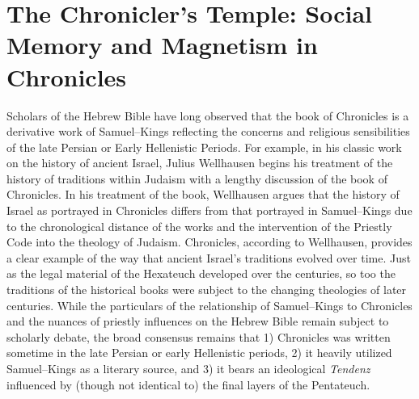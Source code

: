 
\hypertarget{the-chroniclers-temple-social-memory-and-magnetism-in-chronicles}{%
\chapter{The Chronicler's Temple: Social Memory and Magnetism in Chronicles}\label{the-chroniclers-temple-social-memory-and-magnetism-in-chronicles}} 

 Scholars of the Hebrew Bible have long observed that the book of Chronicles is a derivative work of Samuel--Kings reflecting the concerns and religious sensibilities of the late Persian or Early Hellenistic Periods. For example, in his classic work on the history of ancient Israel, Julius Wellhausen begins his treatment of the history of traditions within Judaism with a lengthy discussion of the book of Chronicles. In his treatment of the book, Wellhausen argues that the history of Israel as portrayed in Chronicles differs from that portrayed in Samuel--Kings due to the chronological distance of the works and the intervention of the Priestly Code into the theology of \secondtemple Judaism.\autocites[171--172]{wellhausen1957}[See also][]{wright_ulrich-wright1992} Chronicles, according to Wellhausen, provides a clear example of the way that ancient Israel's traditions evolved over time. Just as the legal material of the Hexateuch developed over the centuries, so too the traditions of the historical books were subject to the changing theologies of later centuries. While the particulars of the relationship of Samuel--Kings to Chronicles and the nuances of priestly influences on the Hebrew Bible remain subject to scholarly debate, the broad consensus remains that 1) Chronicles was written sometime in the late Persian or early Hellenistic periods, 2) it heavily utilized Samuel--Kings as a literary source, and 3) it bears an ideological \emph{Tendenz} influenced by (though not identical to) the final layers of the Pentateuch.\autocites[For a thorough and reasonably recent summary of the \emph{status questionis}, see][72--89]{knoppers2003}[See also][]{japhet1993}{japhet2009}{braun1986}[and][]{coggins1976} 

